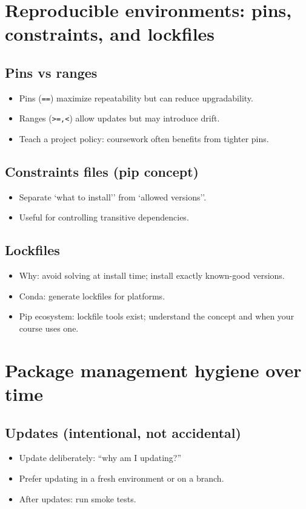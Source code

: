 \section{Reproducible environments: pins, constraints, and lockfiles}
\subsection{Pins vs ranges}
\begin{itemize}
\item Pins (\texttt{==}) maximize repeatability but can reduce upgradability.
\item Ranges (\texttt{>=,<}) allow updates but may introduce drift.
\item Teach a project policy: coursework often benefits from tighter pins.
\end{itemize}

\subsection{Constraints files (pip concept)}
\begin{itemize}
\item Separate `what to install'' from `allowed versions''.
\item Useful for controlling transitive dependencies.
\end{itemize}

\subsection{Lockfiles}
\begin{itemize}
\item Why: avoid solving at install time; install exactly known-good versions.
\item Conda: generate lockfiles for platforms.
\item Pip ecosystem: lockfile tools exist; understand the concept and when your course uses one.
\end{itemize}

\section{Package management hygiene over time}
\subsection{Updates (intentional, not accidental)}
\begin{itemize}
\item Update deliberately: ``why am I updating?''
\item Prefer updating in a fresh environment or on a branch.
\item After updates: run smoke tests.
\end{itemize}

